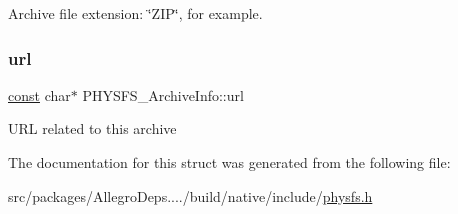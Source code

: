 Archive file extension\+: \char`\"{}\+Z\+I\+P\char`\"{}, for example. \mbox{\label{struct_p_h_y_s_f_s___archive_info_a2b54ca7e3dd183f133c83eeab8399f9f}} 
\subsubsection{\texorpdfstring{url}{url}}
{\footnotesize\ttfamily \hyperlink{zconf_8h_a2c212835823e3c54a8ab6d95c652660e}{const} char$\ast$ P\+H\+Y\+S\+F\+S\+\_\+\+Archive\+Info\+::url}

U\+RL related to this archive 

The documentation for this struct was generated from the following file\+:\begin{DoxyCompactItemize}
\item 
src/packages/\+Allegro\+Deps..../build/native/include/\hyperlink{physfs_8h}{physfs.\+h}\end{DoxyCompactItemize}
